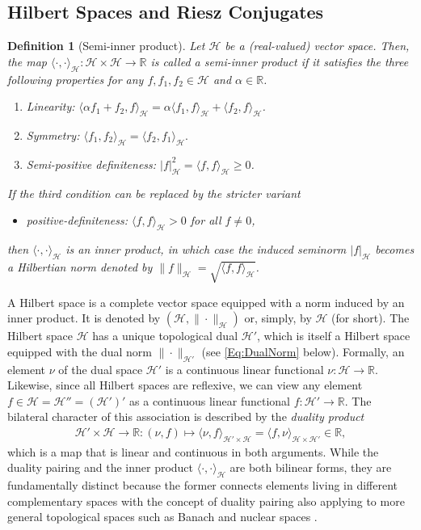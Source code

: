 \documentclass[11pt, english,english]{article}
\newtheorem{definition}{Definition}
\newcommand{\C}{ \mathbb{C}}
\newcommand{\R}{ \mathbb{R}}
\def\Spc#1{{\mathcal{#1}}}  %
\renewcommand{\[}{\begin{equation}}
\renewcommand{\]}[1]{\label{eq:#1}\end{equation}}
\begin{document}
\subsection{Hilbert Spaces and Riesz Conjugates}
\begin{definition}[Semi-inner product] 
Let $\Spc H$ be a (real-valued) vector space. %
Then, the map $\langle \cdot,\cdot \rangle_\Spc H: \Spc H \times \Spc H \to \R$ is called a {\em semi-inner product} if it satisfies the three following properties for any $f, f_1,f_2 \in \Spc H$ and $\alpha \in \R$. %
\begin{enumerate}
\item Linearity: $\langle \alpha f_1 + f_2, f \rangle_{\Spc H}=\alpha \langle f_1, f \rangle_{\Spc H} +\langle f_2, f \rangle_{\Spc H}$.
\item %
Symmetry:  $\langle f_1,f_2\rangle_{\Spc H}=\langle f_2,f_1\rangle_{\Spc H}.$
\item Semi-positive definiteness: $|f|_{\Spc H}^2=\langle f,f\rangle_{\Spc H}\ge 0$.
\end{enumerate}
If the third condition can be replaced by the
stricter variant
\begin{itemize}
\item positive-definiteness: $\langle f,f\rangle_{\Spc H}> 0$  for all $f \ne 0$,
\end{itemize}
then $\langle \cdot,\cdot \rangle_\Spc H$ is an {inner product}, in which case
the induced seminorm $|f|_{\Spc H}$ becomes a Hilbertian norm denoted by $\|f\|_{\Spc H}=\sqrt{\langle f,f\rangle_{\Spc H}}$.
\end{definition}
A Hilbert space is a complete vector space equipped with a norm induced by an inner product. It is denoted by $(\Spc H,\|\cdot\|_{\Spc H})$ or, simply, by $\Spc H$ (for short). The Hilbert space $\Spc H$ has a unique topological dual
$\Spc H'$, which is itself a Hilbert space equipped with the dual norm $\|\cdot\|_{\Spc H'}$ (see \eqref{Eq:DualNorm} below).
Formally, an element $\nu$ of the dual space $\Spc H'$ is a continuous linear functional $\nu: \Spc H \to \R$. 
Likewise, since all Hilbert spaces are reflexive, we can view any element $f \in \Spc H=\Spc H''=(\Spc H')'$ as a continuous linear functional $f: \Spc H'\to \R$.
The bilateral character of this association is described by the {\em duality product}
\begin{align}
\Spc H' \times \Spc H \to \R: (\nu,f) \mapsto \langle \nu, f\rangle_{\Spc H' \times \Spc H}=\langle f,\nu\rangle_{\Spc H \times \Spc H'}\in \R,
\end{align}
which is a map that is linear and continuous in both arguments. While the duality pairing and the inner product $\langle \cdot,\cdot\rangle_\Spc H$ are both bilinear forms, they are fundamentally distinct because the former connects elements living in different complementary spaces with the concept of duality pairing also applying to more general topological spaces such as Banach and nuclear spaces \cite{Rudin1991}.
\end{document}
